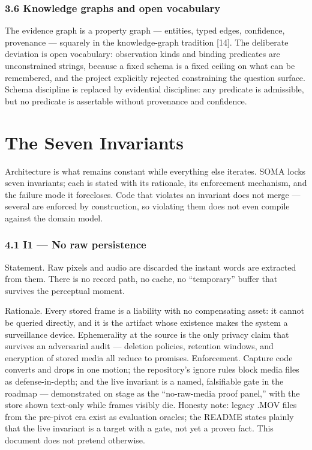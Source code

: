 \subsection{3.6 Knowledge graphs and open vocabulary}\label{knowledge-graphs-and-open-vocabulary}

The evidence graph is a property graph --- entities, typed edges, confidence, provenance --- squarely in the knowledge-graph tradition {[}14{]}. The deliberate deviation is open vocabulary: observation kinds and binding predicates are unconstrained strings, because a fixed schema is a fixed ceiling on what can be remembered, and the project explicitly rejected constraining the question surface. Schema discipline is replaced by evidential discipline: any predicate is admissible, but no predicate is assertable without provenance and confidence.

\chapter{The Seven Invariants}\label{the-seven-invariants}

Architecture is what remains constant while everything else iterates. SOMA locks seven invariants; each is stated with its rationale, its enforcement mechanism, and the failure mode it forecloses. Code that violates an invariant does not merge --- several are enforced by construction, so violating them does not even compile against the domain model.

\subsection{4.1 I1 --- No raw persistence}\label{i1-no-raw-persistence}

Statement. Raw pixels and audio are discarded the instant words are extracted from them. There is no record path, no cache, no ``temporary'' buffer that survives the perceptual moment.

Rationale. Every stored frame is a liability with no compensating asset: it cannot be queried directly, and it is the artifact whose existence makes the system a surveillance device. Ephemerality at the source is the only privacy claim that survives an adversarial audit --- deletion policies, retention windows, and encryption of stored media all reduce to promises. Enforcement. Capture code converts and drops in one motion; the repository's ignore rules block media files as defense-in-depth; and the live invariant is a named, falsifiable gate in the roadmap --- demonstrated on stage as the ``no-raw-media proof panel,'' with the store shown text-only while frames visibly die. Honesty note: legacy .MOV files from the pre-pivot era exist as evaluation oracles; the README states plainly that the live invariant is a target with a gate, not yet a proven fact. This document does not pretend otherwise.

